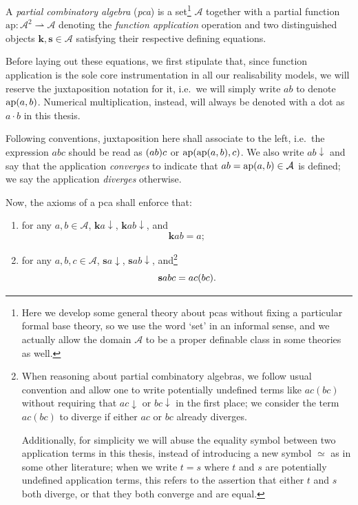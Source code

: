 \documentclass[12pt,openany]{book}
\makeatletter
\newcommand\indg[1]{\index{A@General!#1}}
\theoremstyle{plain}
\theoremstyle{definition}
\newcommand\uplabel[1]{\textup{(#1)}}
\newcommand\bk{\mathbf{k}}
\newcommand\bs{\mathbf{s}}
\makeatother
\begin{document}
A \emph{partial combinatory algebra} (\emph{pca}\indg{pca}) is a set\footnote{Here we develop some general theory about pcas without fixing a particular formal base theory, so we use the word `set' in an informal sense, and we actually allow the domain $\mathcal{A}$ to be a proper definable class in some theories as well.} $\mathcal{A}$ together with a partial function $\mathrm{ap} : \mathcal{A}^2 \rightharpoonup \mathcal{A}$ denoting the \emph{function application} operation and two distinguished objects $\bk, \bs \in \mathcal{A}$ satisfying their respective defining equations.

Before laying out these equations, we first stipulate that, since function application is the sole core instrumentation in all our realisability models, we will reserve the juxtaposition notation for it, i.e.\ we will simply write $ab$ to denote $\mathrm{ap}\mleft(a, b\mright)$. Numerical multiplication, instead, will always be denoted with a dot as $a \cdot b$ in this thesis.

Following conventions, juxtaposition here shall associate to the left, i.e.\ the expression $abc$ should be read as $\mleft(ab\mright) c$ or $\mathrm{ap}\mleft(\mathrm{ap}\mleft(a, b\mright), c\mright)$. We also write $ab {\downarrow}$ and say that the application \emph{converges} to indicate that $ab = \mathrm{ap}\mleft(a, b\mright) \in \mathcal{A}$ is defined; we say the application \emph{diverges} otherwise.

Now, the axioms of a pca shall enforce that:
\begin{enumerate}[label=\uplabel{\roman*}]
  \item for any $a, b \in \mathcal{A}$, $\bk a {\downarrow}$, $\bk ab {\downarrow}$, and
        \[\bk ab = a;\]
  \item for any $a, b, c \in \mathcal{A}$, $\bs a {\downarrow}$, $\bs ab {\downarrow}$, and\footnote{When reasoning about partial combinatory algebras, we follow usual convention and allow one to write potentially undefined terms like $ac(bc)$ without requiring that $ac {\downarrow}$ or $bc {\downarrow}$ in the first place; we consider the term $ac(bc)$ to diverge if either $ac$ or $bc$ already diverges.

          Additionally, for simplicity we will abuse the equality symbol between two application terms in this thesis, instead of introducing a new symbol $\simeq$ as in some other literature; when we write $t = s$ where $t$ and $s$ are potentially undefined application terms, this refers to the assertion that either $t$ and $s$ both diverge, or that they both converge and are equal.}
        \[\bs abc = ac \mleft(bc\mright).\]
\end{enumerate}
\end{document}
